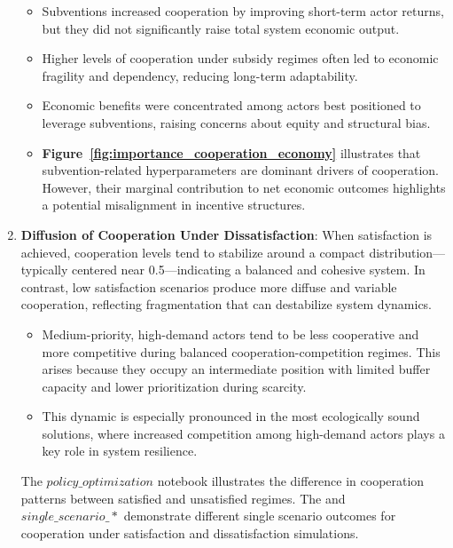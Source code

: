 \documentclass[ruler]{CUP-JNL-EDS}%
\begin{document}
\begin{enumerate}
    \begin{itemize}
        \item Subventions increased cooperation by improving short-term actor returns, but they did not significantly raise total system economic output.
        \item Higher levels of cooperation under subsidy regimes often led to economic fragility and dependency, reducing long-term adaptability.
        \item Economic benefits were concentrated among actors best positioned to leverage subventions, raising concerns about equity and structural bias.
        \item \textbf{Figure~\ref{fig:importance_cooperation_economy}} illustrates that subvention-related hyperparameters are dominant drivers of cooperation. However, their marginal contribution to net economic outcomes highlights a potential misalignment in incentive structures.
    \end{itemize}

    \item \textbf{Diffusion of Cooperation Under Dissatisfaction}:  
    When satisfaction is achieved, cooperation levels tend to stabilize around a compact distribution—typically centered near 0.5—indicating a balanced and cohesive system. In contrast, low satisfaction scenarios produce more diffuse and variable cooperation, reflecting fragmentation that can destabilize system dynamics.  
    \begin{itemize}
        \item Medium-priority, high-demand actors tend to be less cooperative and more competitive during balanced cooperation-competition regimes. This arises because they occupy an intermediate position with limited buffer capacity and lower prioritization during scarcity.
        \item This dynamic is especially pronounced in the most ecologically sound solutions, where increased competition among high-demand actors plays a key role in system resilience.
    \end{itemize}

\noindent The $policy\_optimization$ notebook illustrates the difference in cooperation patterns between satisfied and unsatisfied regimes. The and $single\_scenario\_*$ demonstrate different single scenario outcomes for 
cooperation under satisfaction and dissatisfaction simulations.
\end{enumerate}
\end{document}
